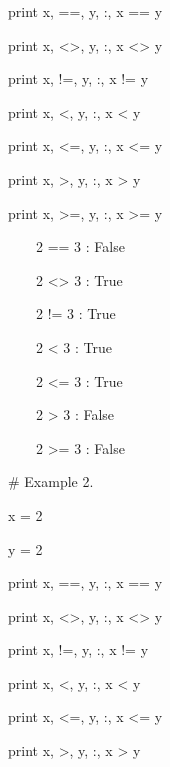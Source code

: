 \documentclass[12pt,twoside]{book}
\begin{document}
print x, {\textquotedbl}=={\textquotedbl}, y, {\textquotedbl}:{\textquotedbl}, x == y

print x, {\textquotedbl}{\textless}{\textgreater}{\textquotedbl}, y, {\textquotedbl}:{\textquotedbl}, x {\textless}{\textgreater} y

print x, {\textquotedbl}!={\textquotedbl}, y, {\textquotedbl}:{\textquotedbl}, x != y

print x, {\textquotedbl}{\textless}{\textquotedbl}, y, {\textquotedbl}:{\textquotedbl}, x {\textless} y

print x, {\textquotedbl}{\textless}={\textquotedbl}, y, {\textquotedbl}:{\textquotedbl}, x {\textless}= y

print x, {\textquotedbl}{\textgreater}{\textquotedbl}, y, {\textquotedbl}:{\textquotedbl}, x {\textgreater} y

print x, {\textquotedbl}{\textgreater}={\textquotedbl}, y, {\textquotedbl}:{\textquotedbl}, x {\textgreater}= y

{\textbar}

\ \ \ \ 2 == 3 : False

\ \ \ \ 2 {\textless}{\textgreater} 3 : True

\ \ \ \ 2 != 3 : True

\ \ \ \ 2 {\textless} 3 : True

\ \ \ \ 2 {\textless}= 3 : True

\ \ \ \ 2 {\textgreater} 3 : False

\ \ \ \ 2 {\textgreater}= 3 : False


\bigskip

\# Example 2.

x = 2

y = 2 \ 


\bigskip

print x, {\textquotedbl}=={\textquotedbl}, y, {\textquotedbl}:{\textquotedbl}, x == y

print x, {\textquotedbl}{\textless}{\textgreater}{\textquotedbl}, y, {\textquotedbl}:{\textquotedbl}, x {\textless}{\textgreater} y

print x, {\textquotedbl}!={\textquotedbl}, y, {\textquotedbl}:{\textquotedbl}, x != y

print x, {\textquotedbl}{\textless}{\textquotedbl}, y, {\textquotedbl}:{\textquotedbl}, x {\textless} y

print x, {\textquotedbl}{\textless}={\textquotedbl}, y, {\textquotedbl}:{\textquotedbl}, x {\textless}= y

print x, {\textquotedbl}{\textgreater}{\textquotedbl}, y, {\textquotedbl}:{\textquotedbl}, x {\textgreater} y
\end{document}

